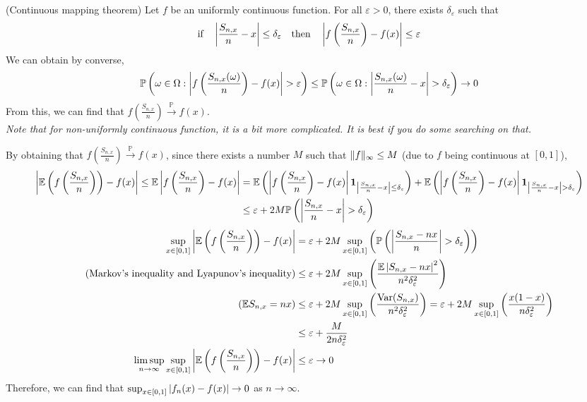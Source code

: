 \documentclass{huhtakm-template-book}
\newcommand{\prob}{\mathbb{P}}
\newcommand{\expect}{\mathbb{E}}
\DeclareMathOperator{\Var}{Var}
\begin{document}
\begin{rem}(Continuous mapping theorem)
	Let $f$ be an uniformly continuous function. For all $\varepsilon>0$, there exists $\delta_{\varepsilon}$ such that
	\begin{equation*}
		\text{if}\quad\left|{\frac{S_{n,x}}{n}-x}\right|\leq\delta_{\varepsilon}\quad\text{then}\quad\left|{f\left(\frac{S_{n,x}}{n}\right)-f(x)}\right|\leq\varepsilon
	\end{equation*}
	We can obtain by converse,
	\begin{equation*}
		\prob\left(\omega\in\Omega:\abs{f\left(\frac{S_{n,x}(\omega)}{n}\right)-f(x)}>\varepsilon\right)\leq\prob\left(\omega\in\Omega:\abs{\frac{S_{n,x}(\omega)}{n}-x}>\delta_{\varepsilon}\right)\to 0
	\end{equation*}
	From this, we can find that $f\left(\frac{S_{n,x}}{n}\right)\xrightarrow{\prob}f(x)$.\\
	\textit{Note that for non-uniformly continuous function, it is a bit more complicated. It is best if you do some searching on that.}
\end{rem}
\newpage
\begin{eg}
	By obtaining that $f\left(\frac{S_{n,x}}{n}\right)\xrightarrow{\prob}f(x)$, since there exists a number $M$ such that $\lVert{f}\rVert_{\infty}\leq M$ (due to $f$ being continuous at $[0,1]$),
	\begin{align*}
		\abs{\expect\left(f\left(\frac{S_{n,x}}{n}\right)\right)-f(x)}\leq\expect\abs{f\left(\frac{S_{n,x}}{n}\right)-f(x)}&=\expect\left(\abs{f\left(\frac{S_{n,x}}{n}\right)-f(x)}\mathbf{1}_{\abs{\frac{S_{n,x}}{n}-x}\leq\delta_{\varepsilon}}\right)+\expect\left(\abs{f\left(\frac{S_{n,x}}{n}\right)-f(x)}\mathbf{1}_{\abs{\frac{S_{n,x}}{n}-x}>\delta_{\varepsilon}}\right)\\
		&\leq\varepsilon+2M\prob\left(\abs{\frac{S_{n,x}}{n}-x}>\delta_{\varepsilon}\right)
	\end{align*}
	\begin{align*}
		\sup_{x\in[0,1]}\abs{\expect\left(f\left(\frac{S_{n,x}}{n}\right)\right)-f(x)}&=\varepsilon+2M\sup_{x\in [0,1]}\left(\prob\left(\abs{\frac{S_{n,x}-nx}{n}}>\delta_{\varepsilon}\right)\right)\\
		\tag{Markov's inequality and Lyapunov's inequality}
		&\leq\varepsilon+2M\sup_{x\in[0,1]}\left(\frac{\expect\abs{S_{n,x}-nx}^{2}}{n^{2}\delta_{\varepsilon}^{2}}\right)\\
		\tag{$\expect S_{n,x}=nx$}
		&\leq\varepsilon+2M\sup_{x\in[0,1]}\left(\frac{\Var(S_{n,x})}{n^{2}\delta_{\varepsilon}^{2}}\right)=\varepsilon+2M\sup_{x\in[0,1]}\left(\frac{x(1-x)}{n\delta_{\varepsilon}^{2}}\right)\\
		&\leq\varepsilon+\frac{M}{2n\delta_{\varepsilon}^{2}}\\
		\limsup_{n\to\infty}\sup_{x\in[0,1]}\abs{\expect\left(f\left(\frac{S_{n,x}}{n}\right)\right)-f(x)}&\leq\varepsilon\to 0
	\end{align*}
	Therefore, we can find that $\sup_{x\in[0,1]}\left|{f_{n}(x)-f(x)}\right|\to 0$ as $n\to\infty$.
\end{eg}
\end{document}
